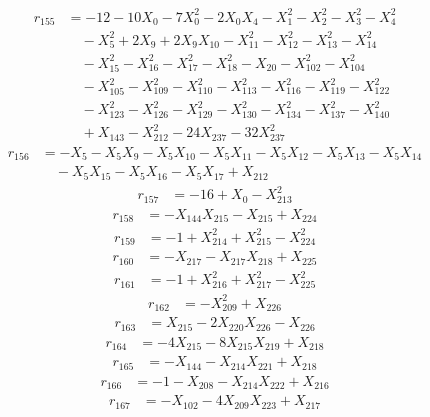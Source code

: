 \begin{align*}
r_{155}&=-12-10X_{0}-7X_{0}^{2}-2X_{0}X_{4}-X_{1}^{2}-X_{2}^{2}-X_{3}^{2}-X_{4}^{2}\\
&\quad -X_{5}^{2}+2X_{9}+2X_{9}X_{10}-X_{11}^{2}-X_{12}^{2}-X_{13}^{2}-X_{14}^{2}\\
&\quad -X_{15}^{2}-X_{16}^{2}-X_{17}^{2}-X_{18}^{2}-X_{20}-X_{102}^{2}-X_{104}^{2}\\
&\quad -X_{105}^{2}-X_{109}^{2}-X_{110}^{2}-X_{113}^{2}-X_{116}^{2}-X_{119}^{2}-X_{122}^{2}\\
&\quad -X_{123}^{2}-X_{126}^{2}-X_{129}^{2}-X_{130}^{2}-X_{134}^{2}-X_{137}^{2}-X_{140}^{2}\\
&\quad +X_{143}-X_{212}^{2}-24X_{237}-32X_{237}^{2}
\end{align*}
\begin{align*}
r_{156}&=-X_{5}-X_{5}X_{9}-X_{5}X_{10}-X_{5}X_{11}-X_{5}X_{12}-X_{5}X_{13}-X_{5}X_{14}\\
&\quad -X_{5}X_{15}-X_{5}X_{16}-X_{5}X_{17}+X_{212}
\end{align*}
\begin{align*}
r_{157}&=-16+X_{0}-X_{213}^{2}
\end{align*}
\begin{align*}
r_{158}&=-X_{144}X_{215}-X_{215}+X_{224}
\end{align*}
\begin{align*}
r_{159}&=-1+X_{214}^{2}+X_{215}^{2}-X_{224}^{2}
\end{align*}
\begin{align*}
r_{160}&=-X_{217}-X_{217}X_{218}+X_{225}
\end{align*}
\begin{align*}
r_{161}&=-1+X_{216}^{2}+X_{217}^{2}-X_{225}^{2}
\end{align*}
\begin{align*}
r_{162}&=-X_{209}^{2}+X_{226}
\end{align*}
\begin{align*}
r_{163}&=X_{215}-2X_{220}X_{226}-X_{226}
\end{align*}
\begin{align*}
r_{164}&=-4X_{215}-8X_{215}X_{219}+X_{218}
\end{align*}
\begin{align*}
r_{165}&=-X_{144}-X_{214}X_{221}+X_{218}
\end{align*}
\begin{align*}
r_{166}&=-1-X_{208}-X_{214}X_{222}+X_{216}
\end{align*}
\begin{align*}
r_{167}&=-X_{102}-4X_{209}X_{223}+X_{217}
\end{align*}
